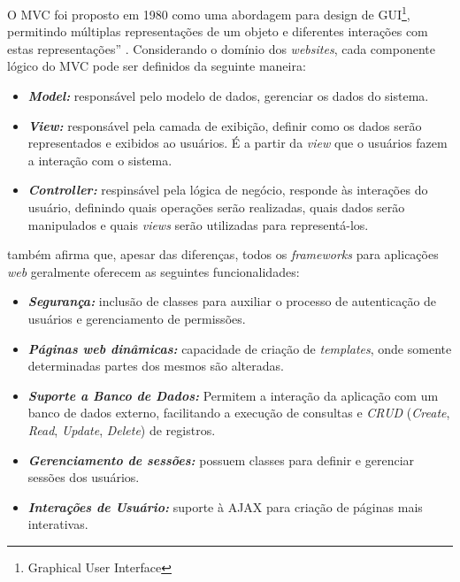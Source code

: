 \documentclass[
  12pt,       %
  openright,      %
  oneside,      %
  a4paper,      %
  english,      %
  french,        %
  spanish,     %
  brazil        %
  ]{abntex2-decsi}
\begin{document}
            O MVC foi proposto em 1980 como uma abordagem para design de GUI\footnote{Graphical User Interface}, permitindo múltiplas representações de um objeto e diferentes interações com estas representações'' \cite[p. 432, tradução nossa]{sommervile:2011}. Considerando o domínio dos \textit{websites}, cada componente lógico do MVC pode ser definidos da seguinte maneira:

            \begin{itemize}
              \item \textbf{\textit{Model:}} responsável pelo modelo de dados, gerenciar os dados do sistema.
              \item \textbf{\textit{View:}} responsável pela camada de exibição, definir como os dados serão representados e exibidos ao usuários. É a partir da \textit{view} que o usuários fazem a interação com o sistema.
              \item \textbf{\textit{Controller:}} respinsável pela lógica de negócio, responde às interações do usuário, definindo quais operações serão realizadas, quais dados serão manipulados e quais \textit{views} serão utilizadas para representá-los.
            \end{itemize}

             também afirma que, apesar das diferenças, todos os \textit{frameworks} para aplicações \textit{web} geralmente oferecem as seguintes funcionalidades:

            \begin{itemize}
                \item \textbf{\textit{Segurança:}} inclusão de classes para auxiliar o processo de autenticação de usuários e gerenciamento de permissões.
                \item \textbf{\textit{Páginas web dinâmicas:}} capacidade de criação de \textit{templates}, onde somente determinadas partes dos mesmos são alteradas.
                \item \textbf{\textit{Suporte a Banco de Dados:}} Permitem a interação da aplicação com um banco de dados externo, facilitando a execução de consultas e \textit{CRUD} (\textit{Create}, \textit{Read}, \textit{Update}, \textit{Delete}) de registros.
                \item \textbf{\textit{Gerenciamento de sessões:}} possuem classes para definir e gerenciar sessões dos usuários.
                \item \textbf{\textit{Interações de Usuário:}} suporte à AJAX para criação de páginas mais interativas.
            \end{itemize}
\end{document}
